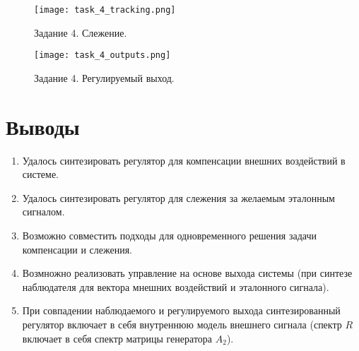 \begin{figure}[]
    \centering
    \texttt{[image: task\_4\_tracking.png]}
    \caption{\label{fig:task4_3_2}Задание 4. Слежение.}
\end{figure}

\begin{figure}[]
    \centering
    \texttt{[image: task\_4\_outputs.png]}
    \caption{\label{fig:task4_3_2}Задание 4. Регулируемый выход.}
\end{figure}

\pagebreak
\section{Выводы}
\begin{enumerate}
    \item Удалось синтезировать регулятор для компенсации внешних воздействий в системе.
    \item Удалось синтезировать регулятор для слежения за желаемым эталонным сигналом.
    \item Возможно совместить подходы для одновременного решения задачи компенсации и слежения. 
    \item Возмножно реализовать управление на основе выхода системы (при синтезе наблюдателя для вектора мнешних воздействий и эталонного сигнала).
    \item При совпадении наблюдаемого и регулируемого выхода синтезированный регулятор включает в себя внутреннюю модель внешнего сигнала (спектр $R$ включает в себя спектр матрицы генератора $A_2$).
\end{enumerate}
\pagebreak